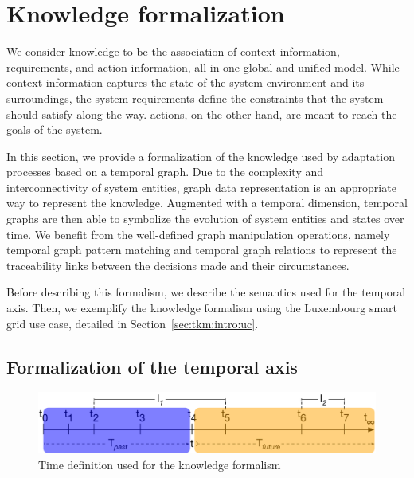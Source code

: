 \section{Knowledge formalization}
\label{sec:tkm:k-formalism}
 
We consider \gls{knowledge} to be the association of \gls{context} information, \glspl{requirement}, and \gls{action} information, all in one global and unified model.
 While \gls{context} information captures the state of the system environment and its surroundings, the system \glspl{requirement} define the constraints that the system should satisfy along the way. 
 \Glspl{action}, on the other hand, are meant to reach the goals of the system.
  
 In this section, we provide a formalization of the \gls{knowledge} used by adaptation processes based on a temporal graph. 
Due to the complexity and interconnectivity of system entities, graph data representation is an appropriate way to represent the \gls{knowledge}. 
Augmented with a temporal dimension, temporal graphs are then able to symbolize the evolution of system entities and states over time. 
We benefit from the well-defined graph manipulation operations, namely temporal graph pattern matching and temporal graph relations to represent the traceability links between the \glspl{decision} made and their \glspl{circumstance}.

Before describing this formalism, we describe the semantics used for the temporal axis.
Then, we exemplify the knowledge formalism using the Luxembourg smart grid use case, detailed in Section~\ref{sec:tkm:intro:uc}.

\subsection{Formalization of the temporal axis}
\label{sec:tkm:k-formalism:timeAxis}

\begin{figure}
   \centering
	\includegraphics[width=\textwidth]{img/chapt-tkm/formalism/formalismeTime}
	\caption{Time definition used for the knowledge formalism}
	\label{fig:tkm:formalismeTime}
\end{figure}

